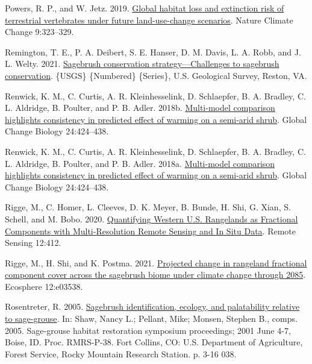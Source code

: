\documentclass[
  12pt,
]{article}
\newlength{\cslhangindent}
\newlength{\cslentryspacingunit} %
\newenvironment{CSLReferences}[2] %
 {%
  \setlength{\parindent}{0pt}
  \ifodd #1
  \let\oldpar\par
  \def\par{\hangindent=\cslhangindent\oldpar}
  \fi
  \setlength{\parskip}{#2\cslentryspacingunit}
 }%
 {}
\begin{document}
\begin{CSLReferences}{1}{0}
\leavevmode{}%
Powers, R. P., and W. Jetz. 2019. \href{https://doi.org/10.1038/s41558-019-0406-z}{Global habitat loss and extinction risk of terrestrial vertebrates under future land-use-change scenarios}. Nature Climate Change 9:323--329.

\leavevmode{}%
Remington, T. E., P. A. Deibert, S. E. Hanser, D. M. Davis, L. A. Robb, and J. L. Welty. 2021. \href{https://doi.org/10.3133/ofr20201125}{Sagebrush conservation strategy---{Challenges} to sagebrush conservation}. \{USGS\} \{Numbered\} \{Series\}, U.S. Geological Survey, Reston, VA.

\leavevmode{}%
Renwick, K. M., C. Curtis, A. R. Kleinhesselink, D. Schlaepfer, B. A. Bradley, C. L. Aldridge, B. Poulter, and P. B. Adler. 2018b. \href{https://doi.org/10.1111/gcb.13900}{Multi-model comparison highlights consistency in predicted effect of warming on a semi-arid shrub}. Global Change Biology 24:424--438.

\leavevmode{}%
Renwick, K. M., C. Curtis, A. R. Kleinhesselink, D. Schlaepfer, B. A. Bradley, C. L. Aldridge, B. Poulter, and P. B. Adler. 2018a. \href{https://doi.org/10.1111/gcb.13900}{Multi-model comparison highlights consistency in predicted effect of warming on a semi-arid shrub}. Global Change Biology 24:424--438.

\leavevmode{}%
Rigge, M., C. Homer, L. Cleeves, D. K. Meyer, B. Bunde, H. Shi, G. Xian, S. Schell, and M. Bobo. 2020. \href{https://doi.org/10.3390/rs12030412}{Quantifying {Western} {U}.{S}. {Rangelands} as {Fractional} {Components} with {Multi}-{Resolution} {Remote} {Sensing} and {In} {Situ} {Data}}. Remote Sensing 12:412.

\leavevmode{}%
Rigge, M., H. Shi, and K. Postma. 2021. \href{https://doi.org/10.1002/ecs2.3538}{Projected change in rangeland fractional component cover across the sagebrush biome under climate change through 2085}. Ecosphere 12:e03538.

\leavevmode{}%
Rosentreter, R. 2005. \href{https://www.fs.usda.gov/treesearch/pubs/21434}{Sagebrush identification, ecology, and palatability relative to sage-grouse}. In: Shaw, Nancy L.; Pellant, Mike; Monsen, Stephen B., comps. 2005. Sage-grouse habitat restoration symposium proceedings; 2001 June 4-7, Boise, ID. Proc. RMRS-P-38. Fort Collins, CO: U.S. Department of Agriculture, Forest Service, Rocky Mountain Research Station. p. 3-16 038.


\end{CSLReferences}
\end{document}
